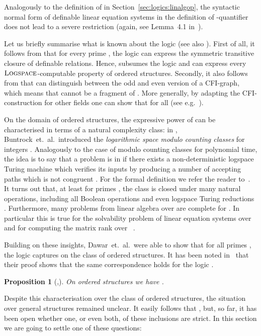 \documentclass[a4paper,UKenglish]{lipics}
\newcommand{\complexityclass}[1]{\ensuremath{\textsc{#1}}\xspace}
\newcommand{\LOGSPACE}{\complexityclass{Logspace}}
\theoremstyle{plain}
\newtheorem{prop}[theorem]{Proposition}
\begin{document}
Analogously to the definition of  in Section~\ref{sec:logics:linalgop}, 
the syntactic normal form of definable linear equation systems in the 
definition of -quantifier does not lead to a severe restriction (again, 
see Lemma~4.1 in~\cite{DaGrHoKoPa13}).

\medskip
Let us briefly summarise what is known about the logic  (see
also \cite{DaGrHoKoPa13,Pa10}). First of all, it follows from \cite{DaGrHoLa09} 
that for
every prime , the logic 
 can express the symmetric transitive closure of definable 
relations. Hence,  subsumes the logic  and can express every 
\LOGSPACE-computable property of ordered structures. Secondly, it also follows
from \cite{DaGrHoLa09} that  can distinguish between the odd and even
version of a CFI-graph, which means that  cannot be a fragment of
. More generally, by adapting the CFI-construction for other fields
one can show that  for all  (see
e.g.\ \cite{Ho10}).

On the domain of ordered structures, the expressive power 
of  can be characterised in terms of a natural complexity 
class: in \cite{BuHeDaMe91}, Buntrock~et.~al.\ introduced
the \emph{logarithmic space modulo counting classes}  for integers
. Analogously to the case of modulo counting classes for polynomial
time, the idea is to say that a problem is in  if there exists a
non-deterministic logspace Turing machine which verifies its inputs by producing
a number of accepting paths which is not congruent . For the 
formal
definition we refer the reader to~\cite{BuHeDaMe91}. It turns out that, at least
for primes , the class  is closed under many natural operations,
including all Boolean operations and even logspace Turing reductions
\cite{BuHeDaMe91,HeReVo00}. Furthermore, many problems from linear
algebra over  are complete for . In particular this is
true for the solvability problem of linear equation systems over 
and for computing the matrix rank over ~\cite{BuHeDaMe91}.

Building on these insights, Dawar~et.~al.\ were able to show that for all
primes , the logic  captures  on the class of ordered
structures. It has been noted in~\cite{Pa10} that their proof shows that 
the same correspondence holds for the logic .
\begin{prop}[\cite{DaGrHoLa09},\cite{Pa10}]
 On ordered structures we have .
\end{prop}

Despite this characterisation over the class of ordered 
structures, the situation over general structures remained unclear. It easily 
follows that , but, 
so far, it 
has been open whether one, or even both, of these inclusions are strict.
In this section we are going to settle one of these questions:
\end{document}
